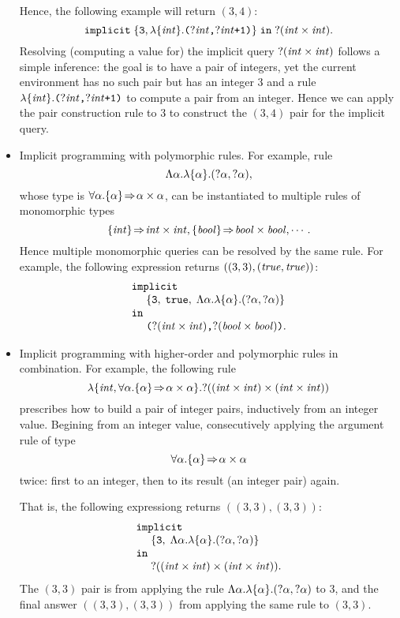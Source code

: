 \begin{itemize}
Hence, the following example will return $(3, 4)$:
\[
\texttt{implicit}\;\{\texttt{3},\lambda\{{\it int\/}\}.\texttt{(\ensuremath{{\it ?\/}{\it int\/}},\ensuremath{{\it ?\/}{\it int\/}}+1)}\}\;\texttt{in}\;{\it ?\/}({\it int\/}\times{\it int\/}).
\]
Resolving (computing a value for) the implicit query
${\it ?\/}({\it int\/}\times{\it int\/})$ follows 
a simple inference: the goal is to have a pair of integers, yet the current
environment has no such pair but has an integer $3$ and a rule 
$\lambda\{{\it int\/}\}.\texttt{(\ensuremath{{\it ?\/}{\it int\/}},\ensuremath{{\it ?\/}{\it int\/}}+1)}$
to compute a pair from an integer. Hence we can apply the pair
construction rule to $3$ to construct the $(3,4)$ pair for the implicit query. 

\item Implicit programming with polymorphic rules. For example, rule 
\[
\Lambda\alpha.\lambda\{\alpha\}.({\it ?\/}\alpha,{\it ?\/}\alpha),
\]
whose type is $\forall\alpha.\{\alpha\}\!\Rightarrow\!\alpha\times\alpha$, can be
instantiated to multiple rules of monomorphic types
\[
\{{\it int\/}\}\!\Rightarrow\!{\it int\/}\times{\it int\/}, 
\{{\it bool\/}\}\!\Rightarrow\!{\it bool\/}\times{\it bool\/}, \cdots.
\]
Hence multiple monomorphic queries can be resolved by the same
rule. For example, the following expression returns
$((3,3),({\it true\/},{\it true\/}))$: 
\[
\begin{array}{l}
\texttt{implicit}\\
\mbox{\ \ \ \ }\{\texttt{3},\;\texttt{true},\;
      \Lambda\alpha.\lambda\{\alpha\}.({\it ?\/}\alpha,{\it ?\/}\alpha)\}\\
\texttt{in}\\
\mbox{\ \ \ \ }
\texttt{(\ensuremath{{\it ?\/}({\it int\/}\times{\it int\/})},\ensuremath{{\it ?\/}({\it bool\/}\times{\it bool\/})})}.
\end{array}
\]

\item Implicit programming with higher-order and polymorphic
  rules in combination. For example, the following rule 
\[
\lambda\{{\it int\/},\forall\alpha.\{\alpha\}\!\Rightarrow\!\alpha\times\alpha\}.{\it ?\/}(({\it int\/}\times{\it int\/})\times({\it int\/}\times{\it int\/}))
\]
prescribes how to build a pair of integer pairs, inductively from an
integer value. Begining from an integer value, consecutively applying the 
argument rule of type
\[
\forall\alpha.\{\alpha\}\!\Rightarrow\!\alpha\times\alpha
\]
twice: first to an integer, then to its result (an
integer pair) again.

That is, the following expressiong returns $((3,3),(3,3))$:
\[
\begin{array}{l}
\texttt{implicit}\\
\mbox{\ \ \ \ }\{\texttt{3},\;
      \Lambda\alpha.\lambda\{\alpha\}.({\it ?\/}\alpha,{\it ?\/}\alpha)\}\\
\texttt{in}\\
\mbox{\ \ \ \ }
\texttt{\ensuremath{{\it ?\/}(({\it int\/}\times{\it int\/})\times({\it int\/}\times{\it int\/}))}}.
\end{array}
\]
The $(3,3)$ pair is from applying the rule 
$\Lambda\alpha.\lambda\{\alpha\}.({\it ?\/}\alpha,{\it ?\/}\alpha)$
to $3$, and the final answer $((3,3),(3,3))$ from applying the same
rule to $(3,3)$.


\end{itemize}
